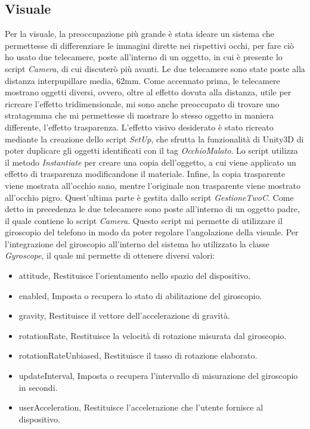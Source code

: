 \documentclass[
a4paper,
cleardoublepage=empty,
headings=twolinechapter,
numbers=autoenddot,
]{scrbook}
\begin{document}
	\subsection{Visuale}
	Per la visuale, la preoccupazione più grande è stata ideare un sistema che permettesse di differenziare le immagini dirette nei rispettivi occhi, per fare ciò ho usato due telecamere, poste all'interno di un oggetto, in cui è presente lo script \textit{Camera}, di cui discuterò più avanti.
	Le due telecamere sono state poste alla distanza interpupillare media, 62mm\cite{Distanza_occhi}.
	Come accennato prima, le telecamere mostrano oggetti diversi, ovvero, oltre al effetto dovuta alla distanza, utile per ricreare l'effetto tridimensionale, mi sono anche preoccupato di trovare uno stratagemma che mi permettesse di mostrare lo stesso oggetto in maniera differente, l'effetto trasparenza.
	L'effetto visivo desiderato è stato ricreato mediante la creazione dello script \textit{SetUp}, che sfrutta la funzionalità di Unity3D di poter duplicare gli oggetti identificati con il tag \textit{OcchioMalato}. Lo script utilizza il metodo \textit{Instantiate} per creare una copia dell'oggetto, a cui viene applicato un effetto di trasparenza modificandone il materiale. Infine, la copia trasparente viene mostrata all'occhio sano, mentre l'originale non trasparente viene mostrato all'occhio pigro. Quest'ultima parte è gestita dallo script \textit{GestioneTwoC}.
	Come detto in precedenza le due telecamere sono poste all'interno di un oggetto padre, il quale contiene lo script \textit{Camera}.
	Questo script mi permette di utilizzare il giroscopio del telefono in modo da poter regolare l'angolazione della visuale.
	Per l'integrazione del giroscopio all'interno del sistema ho utilizzato la classe \textit{Gyroscope}, il quale mi permette di ottenere diversi valori:
	\begin{itemize}
		\item attitude,	Restituisce l'orientamento nello spazio del dispositivo.
		\item enabled, Imposta o recupera lo stato di abilitazione del giroscopio.
		\item gravity, Restituisce il vettore dell'accelerazione di gravità.
		\item rotationRate,	Restituisce la velocità di rotazione misurata dal giroscopio.
		\item rotationRateUnbiased,	Restituisce il tasso di rotazione elaborato.
		\item updateInterval, Imposta o recupera l'intervallo di misurazione del giroscopio in secondi.
		\item userAcceleration,	Restituisce l'accelerazione che l'utente fornisce al dispositivo.
	\end{itemize}
\end{document}
